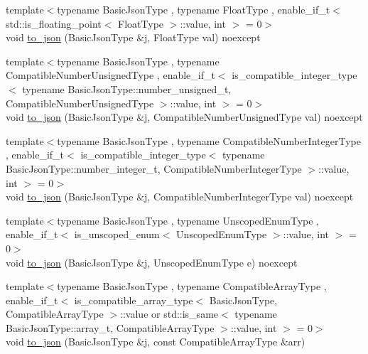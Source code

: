 \begin{DoxyCompactItemize}
\item 
{\footnotesize template$<$typename Basic\+Json\+Type , typename Float\+Type , enable\+\_\+if\+\_\+t$<$ std\+::is\+\_\+floating\+\_\+point$<$ Float\+Type $>$\+::value, int $>$  = 0$>$ }\\void \mbox{\hyperlink{namespacenlohmann_1_1detail_a22bffdc8bc7e43af380ba2050696b230}{to\+\_\+json}} (Basic\+Json\+Type \&j, Float\+Type val) noexcept
\item 
{\footnotesize template$<$typename Basic\+Json\+Type , typename Compatible\+Number\+Unsigned\+Type , enable\+\_\+if\+\_\+t$<$ is\+\_\+compatible\+\_\+integer\+\_\+type$<$ typename Basic\+Json\+Type\+::number\+\_\+unsigned\+\_\+t, Compatible\+Number\+Unsigned\+Type $>$\+::value, int $>$  = 0$>$ }\\void \mbox{\hyperlink{namespacenlohmann_1_1detail_ae5fd66b5517b3b5a6c6b9fd9f29ba8dc}{to\+\_\+json}} (Basic\+Json\+Type \&j, Compatible\+Number\+Unsigned\+Type val) noexcept
\item 
{\footnotesize template$<$typename Basic\+Json\+Type , typename Compatible\+Number\+Integer\+Type , enable\+\_\+if\+\_\+t$<$ is\+\_\+compatible\+\_\+integer\+\_\+type$<$ typename Basic\+Json\+Type\+::number\+\_\+integer\+\_\+t, Compatible\+Number\+Integer\+Type $>$\+::value, int $>$  = 0$>$ }\\void \mbox{\hyperlink{namespacenlohmann_1_1detail_a91fe576be579c8c2fdd14610605c6dd2}{to\+\_\+json}} (Basic\+Json\+Type \&j, Compatible\+Number\+Integer\+Type val) noexcept
\item 
{\footnotesize template$<$typename Basic\+Json\+Type , typename Unscoped\+Enum\+Type , enable\+\_\+if\+\_\+t$<$ is\+\_\+unscoped\+\_\+enum$<$ Unscoped\+Enum\+Type $>$\+::value, int $>$  = 0$>$ }\\void \mbox{\hyperlink{namespacenlohmann_1_1detail_a1f83504de38ee6f440a77ae898b86a18}{to\+\_\+json}} (Basic\+Json\+Type \&j, Unscoped\+Enum\+Type e) noexcept
\item 
{\footnotesize template$<$typename Basic\+Json\+Type , typename Compatible\+Array\+Type , enable\+\_\+if\+\_\+t$<$ is\+\_\+compatible\+\_\+array\+\_\+type$<$ Basic\+Json\+Type, Compatible\+Array\+Type $>$\+::value or std\+::is\+\_\+same$<$ typename Basic\+Json\+Type\+::array\+\_\+t, Compatible\+Array\+Type $>$\+::value, int $>$  = 0$>$ }\\void \mbox{\hyperlink{namespacenlohmann_1_1detail_a3afebc132c5ff83f9cd160e52030fdfd}{to\+\_\+json}} (Basic\+Json\+Type \&j, const Compatible\+Array\+Type \&arr)
\item 

\end{DoxyCompactItemize}
